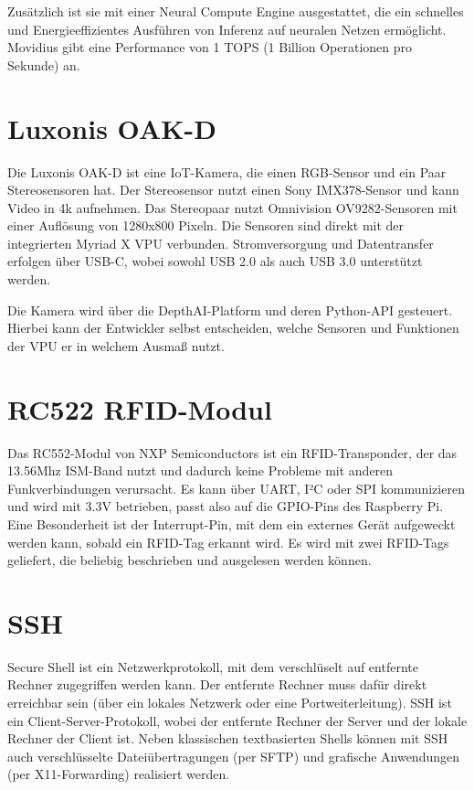Zusätzlich ist sie mit einer Neural Compute Engine ausgestattet, die ein schnelles und Energieeffizientes Ausführen von Inferenz auf neuralen Netzen ermöglicht. Movidius gibt eine Performance von 1 TOPS (1 Billion Operationen pro Sekunde) an.

\section{Luxonis OAK-D}
Die Luxonis OAK-D ist eine IoT-Kamera, die einen RGB-Sensor und ein Paar Stereosensoren hat. Der Stereosensor nutzt einen Sony IMX378-Sensor und kann Video in 4k aufnehmen. Das Stereopaar nutzt Omnivision OV9282-Sensoren mit einer Auflösung von 1280x800 Pixeln.
Die Sensoren sind direkt mit der integrierten Myriad X VPU verbunden. Stromversorgung und Datentransfer erfolgen über USB-C, wobei sowohl USB 2.0 als auch USB 3.0 unterstützt werden.

Die Kamera wird über die DepthAI-Platform und deren Python-API gesteuert. Hierbei kann der Entwickler selbst entscheiden, welche Sensoren und Funktionen der VPU er in welchem Ausmaß nutzt.

\section{RC522 RFID-Modul}

Das RC552-Modul von NXP Semiconductors ist ein RFID-Transponder, der das 13.56Mhz ISM-Band nutzt und dadurch keine Probleme mit anderen Funkverbindungen verursacht. Es kann über UART, I²C oder SPI kommunizieren und wird mit 3.3V betrieben, passt also auf die GPIO-Pins des Raspberry Pi. Eine Besonderheit ist der Interrupt-Pin, mit dem ein externes Gerät aufgeweckt werden kann, sobald ein RFID-Tag erkannt wird. Es wird mit zwei RFID-Tags geliefert, die beliebig beschrieben und ausgelesen werden können. 

\section{SSH}

Secure Shell ist ein Netzwerkprotokoll, mit dem verschlüselt auf entfernte Rechner zugegriffen werden kann. Der entfernte Rechner muss dafür direkt erreichbar sein (über ein lokales Netzwerk oder eine Portweiterleitung).
SSH ist ein Client-Server-Protokoll, wobei der entfernte Rechner der Server und der lokale Rechner der Client ist. Neben klassischen textbasierten Shells können mit SSH auch verschlüsselte Dateiübertragungen (per SFTP) und grafische Anwendungen (per X11-Forwarding) realisiert werden.


